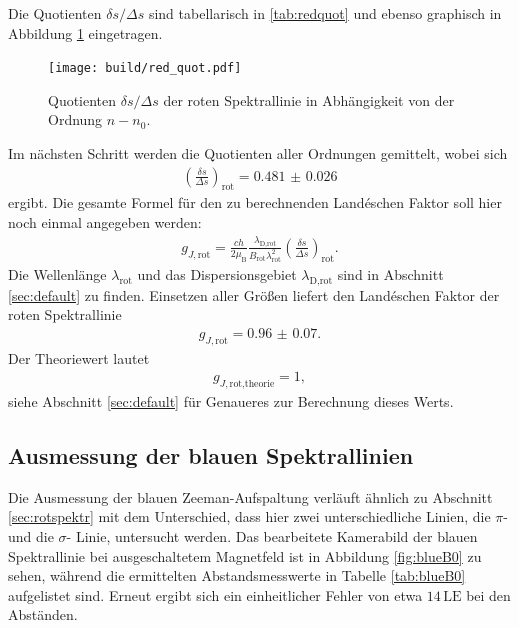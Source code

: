 
Die Quotienten $\delta s/\Delta s$ sind tabellarisch in \ref{tab:redquot} und ebenso
graphisch in Abbildung \ref{fig:redquot} eingetragen.

\begin{figure}[H]
  \centering
  \texttt{[image: build/red\_quot.pdf]}
  \caption{Quotienten $\delta s/\Delta s$ der roten Spektrallinie in Abhängigkeit von der Ordnung $n-n_0$.}
  \label{fig:redquot}
\end{figure}

Im nächsten Schritt werden die Quotienten aller Ordnungen gemittelt, wobei sich
\begin{align}
  \left(\frac{\delta s}{\Delta s}\right)_\text{rot} = \num{0.481(26)}
\end{align}
ergibt. Die gesamte Formel für den zu berechnenden Landéschen Faktor soll hier noch
einmal angegeben werden:
\begin{align}
  g_{J,\text{rot}} = \frac{c h}{2 \mu_\text{B}} \frac{\lambda_\text{D,rot}}{B_\text{rot} \lambda_\text{rot}^2} \left(\frac{\delta s}{\Delta s}\right)_\text{rot}.
\end{align}
Die Wellenlänge $\lambda_\text{rot}$ und das Dispersionsgebiet $\lambda_\text{D,rot}$ sind in Abschnitt \ref{sec:default}
zu finden. Einsetzen aller Größen liefert den Landéschen Faktor der roten Spektrallinie
\begin{align}
  g_{J,\text{rot}} = \num{0.96(7)}.
\end{align}
Der Theoriewert lautet
\begin{align}
  g_{J,\text{rot,theorie}} = 1,
\end{align}
siehe Abschnitt \ref{sec:default} für Genaueres zur Berechnung dieses Werts.

\subsection{Ausmessung der blauen Spektrallinien}

Die Ausmessung der blauen Zeeman-Aufspaltung verläuft ähnlich zu Abschnitt \ref{sec:rotspektr}
mit dem Unterschied, dass hier zwei unterschiedliche Linien, die $\pi$- und die $\sigma$- Linie,
untersucht werden. Das bearbeitete Kamerabild der blauen Spektrallinie bei ausgeschaltetem Magnetfeld
ist in Abbildung \ref{fig:blueB0} zu sehen, während die ermittelten Abstandsmesswerte in Tabelle \ref{tab:blueB0}
aufgelistet sind. Erneut ergibt sich ein einheitlicher Fehler von etwa $14 \, \text{LE}$ bei den
Abständen.


